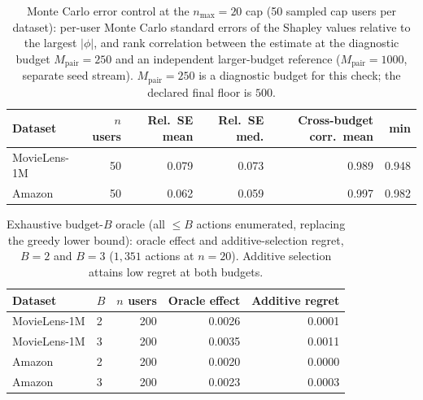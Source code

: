 \begin{table}[!htbp]\centering\scriptsize\setlength{\tabcolsep}{3pt}
\caption{Monte Carlo error control at the $n_{\max}=20$ cap (50 sampled
cap users per dataset): per-user Monte Carlo standard errors of the Shapley
values relative to the largest $|\phi|$, and rank correlation between the
estimate at the diagnostic budget $M_{\mathrm{pair}}=250$ and an independent
larger-budget reference ($M_{\mathrm{pair}}=1000$, separate seed stream).
$M_{\mathrm{pair}}=250$ is a diagnostic budget for this check; the declared
final floor is $500$.}
\label{tab:review8-mcse}
\begin{tabular}{@{}lrrrrr@{}}
\toprule
Dataset & $n$ users & Rel.\ SE mean & Rel.\ SE med. & Cross-budget corr.\ mean & min \\
\midrule
MovieLens-1M & 50 & 0.079 & 0.073 & 0.989 & 0.948 \\
Amazon & 50 & 0.062 & 0.059 & 0.997 & 0.982 \\
\bottomrule\end{tabular}\end{table}
\begin{table}[!htbp]\centering\scriptsize\setlength{\tabcolsep}{3pt}
\caption{Exhaustive budget-$B$ oracle (all $\le B$ actions enumerated, replacing
the greedy lower bound): oracle effect and additive-selection regret, $B=2$
and $B=3$ ($1{,}351$ actions at $n=20$). Additive selection attains low regret
at both budgets.}
\label{tab:review8-b3}
\begin{tabular}{@{}llrrr@{}}
\toprule
Dataset & $B$ & $n$ users & Oracle effect & Additive regret \\
\midrule
MovieLens-1M & 2 & 200 & 0.0026 & 0.0001 \\
MovieLens-1M & 3 & 200 & 0.0035 & 0.0011 \\
Amazon & 2 & 200 & 0.0020 & 0.0000 \\
Amazon & 3 & 200 & 0.0023 & 0.0003 \\
\bottomrule\end{tabular}\end{table}